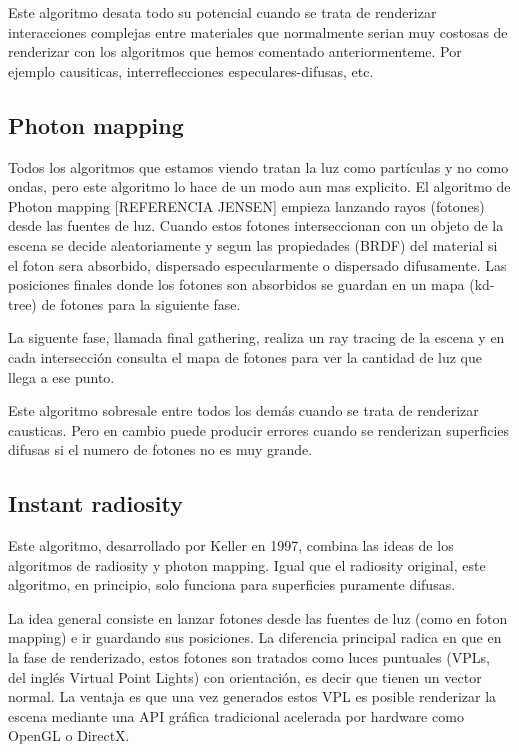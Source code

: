 \medskip
Este algoritmo desata todo su potencial cuando se trata de renderizar interacciones complejas entre materiales que normalmente serian muy costosas de renderizar con los algoritmos que hemos comentado anteriormenteme. Por ejemplo causiticas, interreflecciones especulares-difusas, etc.

\clearpage

\subsection{Photon mapping}

Todos los algoritmos que estamos viendo tratan la luz como partículas y no como ondas, pero este algoritmo lo hace de un modo aun mas explicito.
El algoritmo de Photon mapping [REFERENCIA JENSEN] empieza lanzando rayos (fotones) desde las fuentes de luz. Cuando estos fotones interseccionan con un objeto de la escena se decide aleatoriamente y segun las propiedades (BRDF) del material si el foton sera absorbido, dispersado especularmente o dispersado difusamente. Las posiciones finales donde los fotones son absorbidos se guardan en un mapa (kd-tree) de fotones para la siguiente fase.

\medskip
La siguente fase, llamada final gathering, realiza un ray tracing de la escena y en cada intersección consulta el mapa de fotones para ver la cantidad de luz que llega a ese punto.

\medskip
Este algoritmo sobresale entre todos los demás cuando se trata de renderizar causticas. Pero en cambio puede producir errores cuando se renderizan superficies difusas si el numero de fotones no es muy grande.


\subsection{Instant radiosity}

Este algoritmo, desarrollado por Keller en 1997, combina las ideas de los algoritmos de radiosity y photon mapping. Igual que el radiosity original, este algoritmo, en principio, solo funciona para superficies puramente difusas.

\medskip
La idea general consiste en lanzar fotones desde las fuentes de luz (como en foton mapping) e ir guardando sus posiciones. La diferencia principal radica en que en la fase de renderizado, estos fotones son tratados como luces puntuales (VPLs, del inglés Virtual Point Lights) con orientación, es decir que tienen un vector normal. La ventaja es que una vez generados estos VPL es posible renderizar la escena mediante una API gráfica tradicional acelerada por hardware como OpenGL o DirectX.

